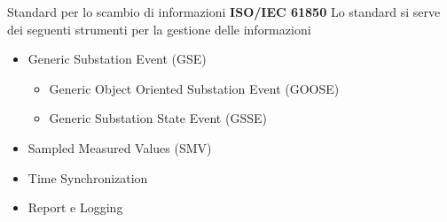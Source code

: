 \begin{frame}{Standard per lo scambio di informazioni}
\textbf{ISO/IEC 61850}
\newline
Lo standard si serve dei seguenti strumenti per la gestione delle informazioni
\begin{itemize}[<+- | alert@+>]
	\item Generic Substation Event (GSE)
	\begin{itemize}[<+- | alert@+>]
		\item Generic Object Oriented Substation Event (GOOSE)
		\item Generic Substation State Event (GSSE)
	\end{itemize}
	\item Sampled Measured Values (SMV)
	\item Time Synchronization
	\item Report e Logging
\end{itemize}
\end{frame}

